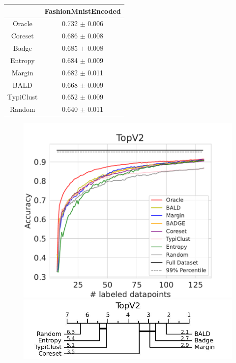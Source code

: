 \documentclass[]{article}
\begin{document}
\begin{minipage}{0.29\linewidth}
\begin{tabular}{c|c}
&FashionMnistEncoded\\
\hline
Oracle&0.732 $\pm$ 0.006\\
Coreset&0.686 $\pm$ 0.008\\
Badge&0.685 $\pm$ 0.008\\
Entropy&0.684 $\pm$ 0.009\\
Margin&0.682 $\pm$ 0.011\\
BALD&0.668 $\pm$ 0.009\\
TypiClust&0.652 $\pm$ 0.009\\
Random&0.640 $\pm$ 0.011\\
\end{tabular}
\end{minipage}
\begin{minipage}{0.65\linewidth}
\begin{figure}[H]
    \centering
\includegraphics[width=\linewidth]{img/eval_topv2} \\[2mm]
\includegraphics[width=\linewidth]{img/micro_topv2.jpg}
\end{figure}
\end{minipage}
\end{document}
